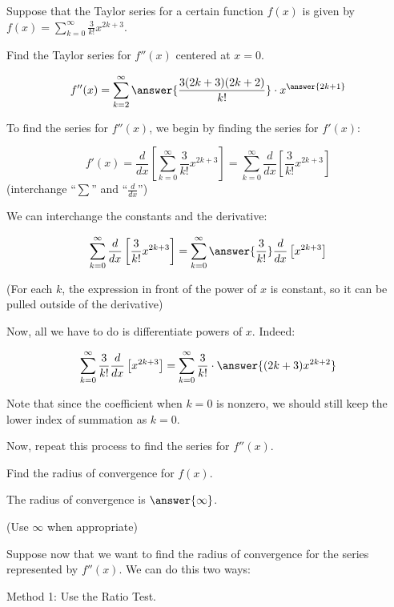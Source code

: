 \documentclass{ximera}
\author{Jim Talamo}
\begin{document}
\begin{exercise}
Suppose that the Taylor series for a certain function $f(x)$ is given by $f(x) = \sum_{k=0}^{\infty} \frac{3}{k!} x^{2k+3}$.  

Find the Taylor series for $f''(x)$ centered at $x=0$.

\[
f''(x) = \sum_{k=2}^{\infty} \answer{\frac{3(2k+3)(2k+2)}{k!}} \cdot x^{\answer{2k+1}}
\]


\begin{hint}
To find the series for $f''(x)$, we begin by finding the series for $f'(x)$:

\[
f'(x) = \frac{d}{dx} \left[\sum_{k=0}^{\infty}  \frac{3}{k!} x^{2k+3}  \right] = \sum_{k=0}^{\infty}  \frac{d}{dx} \left[ \frac{3}{k!} x^{2k+3}  \right]
\]
(interchange ``$\sum$'' and ``$\frac{d}{dx}$'')

We can interchange the constants and the derivative:

\[
\sum_{k=0}^{\infty}  \frac{d}{dx} \left[\frac{3}{k!} x^{2k+3}\right] = \sum_{k=0}^{\infty} \answer{\frac{3}{k!}} \frac{d}{dx} \left[ x^{2k+3}  \right]
\]

(For each $k$, the expression in front of the power of $x$ is constant, so it can be pulled outside of the derivative)

Now, all we have to do is differentiate powers of $x$.  Indeed:

\[
\sum_{k=0}^{\infty}\frac{3}{k!} \frac{d}{dx} \left[ x^{2k+3}  \right] = \sum_{k=0}^{\infty} \frac{3}{k!} \cdot\answer{(2k+3)x^{2k+2}}
\]

Note that since the coefficient when $k=0$ is nonzero, we should still keep the lower index of summation as $k=0$.  

Now, repeat this process to find the series for $f''(x)$.

\end{hint}


\begin{exercise}
Find the radius of convergence for $f(x)$.

The radius of convergence is $\answer{\infty}$.

(Use $\infty$ when appropriate)

\begin{exercise}
Suppose now that we want to find the radius of convergence for the series represented by $f''(x)$.  We can do this two ways:

\begin{exercise}
Method 1: Use the Ratio Test.


\end{exercise}
\end{exercise}
\end{exercise}
\end{exercise}
\end{document}
